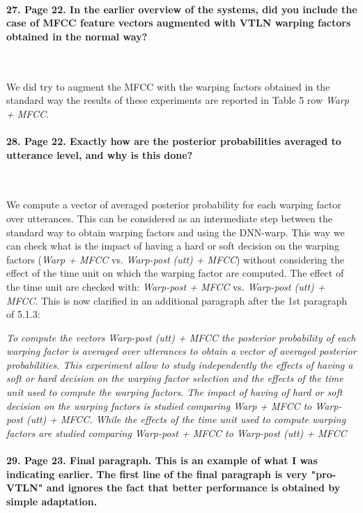 \documentclass[]{article}
\begin{document}
\paragraph{27. Page 22. In the earlier overview of the systems, did you include the case of MFCC feature vectors augmented with VTLN warping factors obtained in the normal way?}

~

We did try to augment the MFCC with the warping factors obtained in the standard way the results of these experiments are reported in Table 5 row {\em Warp + MFCC}.

\paragraph{28. Page 22. Exactly how are the posterior probabilities averaged to utterance level, and why is this done?}

~

We compute a vector of averaged posterior probability for each warping factor over utterances. This can be considered as an intermediate step between the standard way to obtain warping factors and using the DNN-warp. This way we can check what is the impact of having a hard or soft decision on the warping factors ({\em Warp + MFCC} vs. {\em Warp-post (utt) + MFCC}) without considering the effect of the time unit on which the warping factor are computed. The effect of the time unit are checked with: {\em Warp-post + MFCC} vs. {\em Warp-post (utt) + MFCC}. This is now clarified in an additional paragraph after the 1st paragraph of 5.1.3:

\textit{To compute the vectors {\em Warp-post (utt) + MFCC} the posterior probability of each warping factor is averaged over utterances to obtain a vector of averaged posterior probabilities. This experiment allow to study independently the effects of having a soft or hard decision on the warping factor selection and the effects of the time unit used to compute the warping factors. The impact of having of hard or soft decision on the warping factors is studied comparing {\em Warp + MFCC} to {\em Warp-post (utt) + MFCC}. While the effects of the time unit used to compute warping factors are studied comparing {\em Warp-post + MFCC} to {\em Warp-post (utt) + MFCC}}

\paragraph{29. Page 23. Final paragraph. This is an example of what I was indicating earlier. The first line of the final paragraph is very "pro-VTLN" and ignores the fact that better performance is obtained by simple adaptation.}
\end{document}
